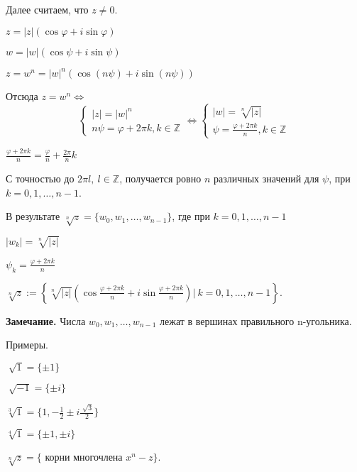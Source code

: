 Далее считаем, что $z \neq 0$.

$z = |z|(\cos \varphi + i \sin \varphi)$

$w = |w|(\cos \psi + i \sin \psi)$

$z = w^n = |w|^n (\cos (n \psi) + i \sin (n \psi))$

Отсюда $z = w^n \Leftrightarrow$ \begin{equation*}
	\left\{
		\begin{aligned}
			|z| = |w|^n  \\
			n \psi = \varphi + 2 \pi k, k \in \mathbb{Z} 
		\end{aligned}
	\right. \Leftrightarrow \left\{
		\begin{aligned}
			|w| = \sqrt[n]{|z|}  \\
			\psi = \frac{\varphi + 2 \pi k}{n}, k \in \mathbb{Z}
		\end{aligned}
	\right.
\end{equation*}

$\frac{\varphi + 2 \pi k}{n} = \frac{\varphi}{n} + \frac{2 \pi}{n} k$

С точностью до $2 \pi l, \ l \in \mathbb{Z}$, получается ровно $n$ различных значений для $\psi$, при $k = 0,1, \dots, n-1$.

В результате $\sqrt[n]{z} = \{w_0, w_1, \dots, w_{n-1} \}$, где при $k = 0, 1, \dots, n-1$ 

$|w_k| = \sqrt[n]{|z|}$

$\psi_k = \frac{\varphi + 2 \pi k}{n}$

\vspace{\baselineskip}
$\sqrt[n]{z} := \left\{ \sqrt[n]{|z|} \left( \cos \frac{\varphi + 2 \pi k}{n} + i \sin \frac{\varphi + 2 \pi k}{n} \right) | \ k = 0, 1, \dots, n-1  \right\}$.

\vspace{\baselineskip}
\textbf{Замечание.} Числа $w_0, w_1, \dots, w_{n-1}$ лежат в вершинах правильного n-угольника.

\vspace{\baselineskip}
Примеры. 

$\sqrt[]{1} = \{\pm 1\}$

$\sqrt[]{-1} = \{\pm i\}$

$\sqrt[3]{1} = \{1, -\frac{1}{2} \pm i \frac{\sqrt[]{3}}{2} \}$

$\sqrt[4]{1} = \{ \pm 1, \pm i \}$

\vspace{\baselineskip}
$\sqrt[n]{z} = \{$ корни многочлена $x^n - z \}$.

